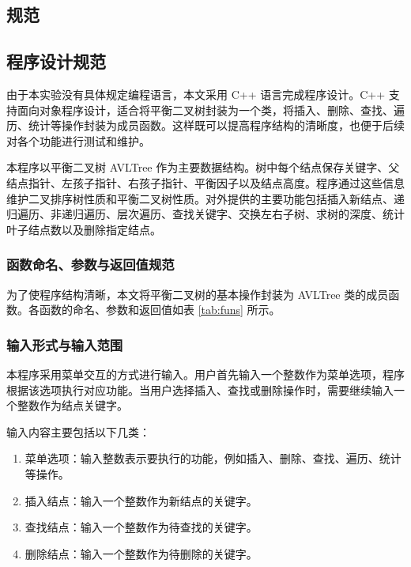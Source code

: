 \documentclass[a4paper, 12pt, oneside]{article}
\theoremstyle{cn_theorem}
\begin{document}
\subsection{规范}
\subsection{程序设计规范}

由于本实验没有具体规定编程语言，本文采用 C++ 语言完成程序设计。C++ 支持面向对象程序设计，适合将平衡二叉树封装为一个类，将插入、删除、查找、遍历、统计等操作封装为成员函数。这样既可以提高程序结构的清晰度，也便于后续对各个功能进行测试和维护。

本程序以平衡二叉树 AVLTree 作为主要数据结构。树中每个结点保存关键字、父结点指针、左孩子指针、右孩子指针、平衡因子以及结点高度。程序通过这些信息维护二叉排序树性质和平衡二叉树性质。对外提供的主要功能包括插入新结点、递归遍历、非递归遍历、层次遍历、查找关键字、交换左右子树、求树的深度、统计叶子结点数以及删除指定结点。

\subsubsection{函数命名、参数与返回值规范}

为了使程序结构清晰，本文将平衡二叉树的基本操作封装为 AVLTree 类的成员函数。各函数的命名、参数和返回值如表 \ref{tab:funs} 所示。



\subsubsection{输入形式与输入范围}

本程序采用菜单交互的方式进行输入。用户首先输入一个整数作为菜单选项，程序根据该选项执行对应功能。当用户选择插入、查找或删除操作时，需要继续输入一个整数作为结点关键字。

输入内容主要包括以下几类：

\begin{enumerate}
    \item {
          菜单选项：输入整数表示要执行的功能，例如插入、删除、查找、遍历、统计等操作。
          }
    \item {
          插入结点：输入一个整数作为新结点的关键字。
          }
    \item 查找结点：输入一个整数作为待查找的关键字。
    \item 删除结点：输入一个整数作为待删除的关键字。
\end{enumerate}
\end{document}
